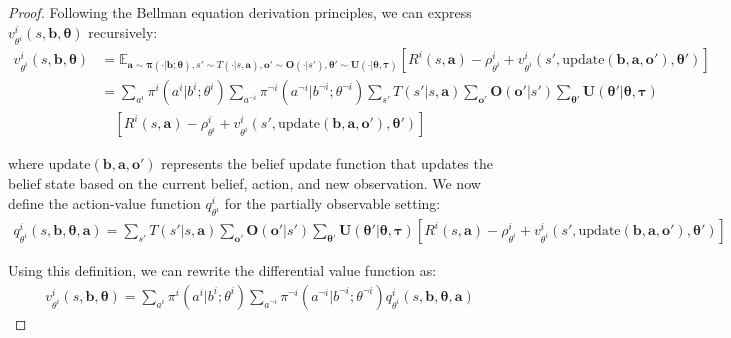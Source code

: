 \begin{proof}
    Following the Bellman equation derivation principles, we can express
    $v^{i}_{\theta^i}(s, \boldsymbol{b}, \boldsymbol{\theta})$ recursively:
    \begin{align}
        v^{i}_{\theta^i}(s, \boldsymbol{b}, \boldsymbol{\theta}) & = \mathbb{E}_{\boldsymbol{a} \sim \boldsymbol{\pi}(\cdot|\boldsymbol{b};\boldsymbol{\theta}), s' \sim T(\cdot|s,\boldsymbol{a}), \boldsymbol{o}' \sim \boldsymbol{O}(\cdot|s'), \boldsymbol{\theta}' \sim \boldsymbol{U}(\cdot|\boldsymbol{\theta}, \boldsymbol{\tau})}\left[ R^{i}(s, \boldsymbol{a}) - \rho^{i}_{\theta^i}+ v^{i}_{\theta^i}(s', \text{update}(\boldsymbol{b}, \boldsymbol{a}, \boldsymbol{o}'), \boldsymbol{\theta}') \right] \\
                                                                 & = \sum_{a^i}\pi^{i}(a^{i}|b^{i}; \theta^{i}) \sum_{a^{\neg i}}\pi^{\neg i}(a^{\neg i}|b^{\neg i}; \theta^{\neg i}) \sum_{s'}T(s'|s, \boldsymbol{a}) \sum_{\boldsymbol{o}'}\boldsymbol{O}(\boldsymbol{o}'|s') \sum_{\boldsymbol{\theta}'}\boldsymbol{U}(\boldsymbol{\theta}'|\boldsymbol{\theta}, \boldsymbol{\tau})                                                                                                                              \\
                                                                 & \quad \left[ R^{i}(s, \boldsymbol{a}) - \rho^{i}_{\theta^i}+ v^{i}_{\theta^i}(s', \text{update}(\boldsymbol{b}, \boldsymbol{a}, \boldsymbol{o}'), \boldsymbol{\theta}') \right]
    \end{align}

    where $\text{update}(\boldsymbol{b}, \boldsymbol{a}, \boldsymbol{o}')$
    represents the belief update function that updates the belief state based on
    the current belief, action, and new observation. We now define the action-value
    function $q^{i}_{\theta^i}$ for the partially observable setting:
    \begin{align}
        q^{i}_{\theta^i}(s, \boldsymbol{b}, \boldsymbol{\theta}, \boldsymbol{a}) = \sum_{s'}T(s'|s, \boldsymbol{a}) \sum_{\boldsymbol{o}'}\boldsymbol{O}(\boldsymbol{o}'|s') \sum_{\boldsymbol{\theta}'}\boldsymbol{U}(\boldsymbol{\theta}'|\boldsymbol{\theta}, \boldsymbol{\tau}) \left[ R^{i}(s, \boldsymbol{a}) - \rho^{i}_{\theta^i}+ v^{i}_{\theta^i}(s', \text{update}(\boldsymbol{b}, \boldsymbol{a}, \boldsymbol{o}'), \boldsymbol{\theta}') \right]
    \end{align}

    Using this definition, we can rewrite the differential value function as:
    \begin{align}
        v^{i}_{\theta^i}(s, \boldsymbol{b}, \boldsymbol{\theta}) = \sum_{a^i}\pi^{i}(a^{i}|b^{i}; \theta^{i}) \sum_{a^{\neg i}}\pi^{\neg i}(a^{\neg i}|b^{\neg i}; \theta^{\neg i}) q^{i}_{\theta^i}(s, \boldsymbol{b}, \boldsymbol{\theta}, \boldsymbol{a})
    \end{align}


\end{proof}
